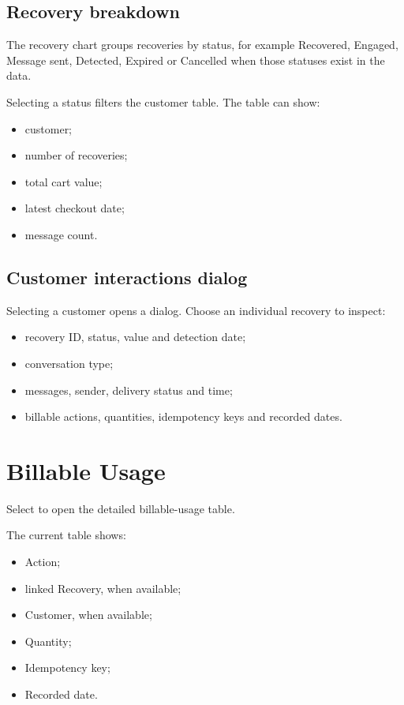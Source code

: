 \section{Recovery breakdown}
The recovery chart groups recoveries by status, for example Recovered, Engaged, Message sent, Detected, Expired or Cancelled when those statuses exist in the data.

Selecting a status filters the customer table. The table can show:
\begin{itemize}
  \item customer;
  \item number of recoveries;
  \item total cart value;
  \item latest checkout date;
  \item message count.
\end{itemize}


\section{Customer interactions dialog}
Selecting a customer opens a dialog. Choose an individual recovery to inspect:
\begin{itemize}
  \item recovery ID, status, value and detection date;
  \item conversation type;
  \item messages, sender, delivery status and time;
  \item billable actions, quantities, idempotency keys and recorded dates.
\end{itemize}


\chapter{Billable Usage}

Select  to open the detailed billable-usage table.

The current table shows:
\begin{itemize}
  \item Action;
  \item linked Recovery, when available;
  \item Customer, when available;
  \item Quantity;
  \item Idempotency key;
  \item Recorded date.
\end{itemize}

